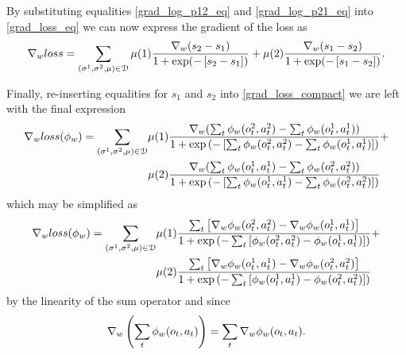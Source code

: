 \begin{answer}
  By substituting equalities \ref{grad_log_p12_eq} and \eqref{grad_log_p21_eq} into \eqref{grad_loss_eq} we can now express the gradient of the loss as
  \begin{equation}\label{grad_loss_compact}
    \nabla_{w} loss = \sum_{(\sigma^{1}, \sigma^{2}, \mu) \in {\cal D}} \mu(1) \frac{\nabla_{w}(s_{2} - s_{1})}{1 + \exp(-\left[s_{2} - s_{1}\right])} + \mu(2) \frac{\nabla_{w}(s_{1} - s_{2})}{1 + \exp(-\left[s_{1} - s_{2}\right])}.
  \end{equation}

  Finally, re-inserting equalities for $s_{1}$ and $s_{2}$ into \ref{grad_loss_compact} we are left with the final expression
  \begin{align}
    \nabla_{w} loss(\phi_{w}) = \sum_{(\sigma^{1}, \sigma^{2}, \mu) \in {\cal D}} &\mu(1) \frac{\nabla_{w}(\sum_{t}\phi_{w}(o^{2}_{t}, a^{2}_{t}) - \sum_{t}\phi_{w}(o^{1}_{t}, a^{1}_{t}))}{1 + \exp\left(-\left[\sum_{t}\phi_{w}(o^{2}_{t}, a^{2}_{t}) - \sum_{t}\phi_{w}(o^{1}_{t}, a^{1}_{t})\right]\right)} + \\ &\mu(2) \frac{\nabla_{w}(\sum_{t}\phi_{w}(o^{1}_{t}, a^{1}_{t}) - \sum_{t}\phi_{w}(o^{2}_{t}, a^{2}_{t}))}{1 + \exp\left(-\left[\sum_{t}\phi_{w}(o^{1}_{t}, a^{1}_{t}) - \sum_{t}\phi_{w}(o^{2}_{t}, a^{2}_{t})\right]\right)}
  \end{align}
  which may be simplified as
  \begin{align}
    \nabla_{w} loss(\phi_{w}) = \sum_{(\sigma^{1}, \sigma^{2}, \mu) \in {\cal D}} &\mu(1) \frac{\sum_{t}\left[\nabla_{w}\phi_{w}(o^{2}_{t}, a^{2}_{t}) - \nabla_{w}\phi_{w}(o^{1}_{t}, a^{1}_{t})\right]}{1 + \exp\left(-\sum_{t}\left[\phi_{w}(o^{2}_{t}, a^{2}_{t}) - \phi_{w}(o^{1}_{t}, a^{1}_{t})\right]\right)} + \\  &\mu(2) \frac{\sum_{t}\left[\nabla_{w}\phi_{w}(o^{1}_{t}, a^{1}_{t}) - \nabla_{w}\phi_{w}(o^{2}_{t}, a^{2}_{t})\right]}{1 + \exp\left(-\sum_{t}\left[\phi_{w}(o^{1}_{t}, a^{1}_{t}) - \phi_{w}(o^{2}_{t}, a^{2}_{t})\right]\right)}
  \end{align}
  by the linearity of the sum operator and since
  \begin{equation}
    \nabla_{w}\left(\sum_{t} \phi_{w}(o_{t}, a_{t})\right) = \sum_{t} \nabla_{w}\phi_{w}(o_{t}, a_{t}). \\
  \end{equation}


\end{answer}
